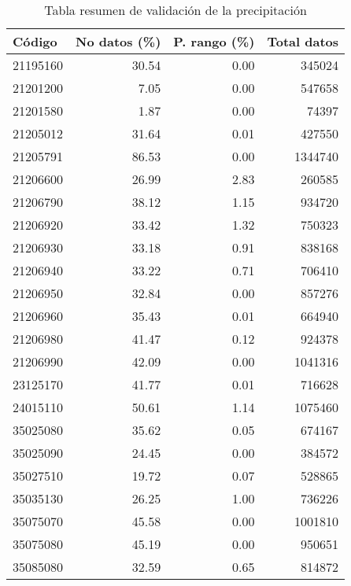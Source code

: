 \documentclass[11pt]{article}
\begin{document}
\begin{table}[H]
\begin{center}
\begin{tabular}{lrrr}
\toprule
      Código &  No datos (\%) &  P. rango (\%) & Total datos \\
\midrule
 21195160 &     30.54 &      0.00 &        345024 \\
 21201200 &      7.05 &      0.00 &        547658 \\
 21201580 &      1.87 &      0.00 &         74397 \\
 21205012 &     31.64 &      0.01 &        427550 \\
 21205791 &     86.53 &      0.00 &       1344740 \\
 21206600 &     26.99 &      2.83 &        260585 \\
 21206790 &     38.12 &      1.15 &        934720 \\
 21206920 &     33.42 &      1.32 &        750323 \\
 21206930 &     33.18 &      0.91 &        838168 \\
 21206940 &     33.22 &      0.71 &        706410 \\
 21206950 &     32.84 &      0.00 &        857276 \\
 21206960 &     35.43 &      0.01 &        664940 \\
 21206980 &     41.47 &      0.12 &        924378 \\
 21206990 &     42.09 &      0.00 &       1041316 \\
 23125170 &     41.77 &      0.01 &        716628 \\
 24015110 &     50.61 &      1.14 &       1075460 \\
 35025080 &     35.62 &      0.05 &        674167 \\
 35025090 &     24.45 &      0.00 &        384572 \\
 35027510 &     19.72 &      0.07 &        528865 \\
 35035130 &     26.25 &      1.00 &        736226 \\
 35075070 &     45.58 &      0.00 &       1001810 \\
 35075080 &     45.19 &      0.00 &        950651 \\
 35085080 &     32.59 &      0.65 &        814872 \\
\bottomrule
\end{tabular}
		\caption{Tabla resumen de validación de la precipitación}
		\label{tabla:val_precipitacion}
\end{center}
\end{table}
\end{document}
